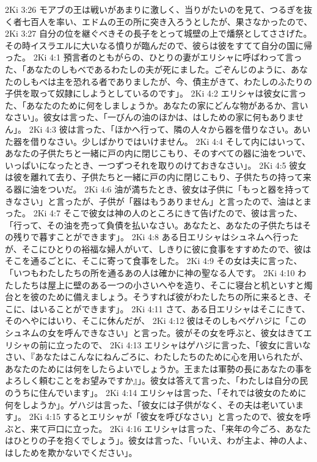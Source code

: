 2Ki 3:26  モアブの王は戦いがあまりに激しく、当りがたいのを見て、つるぎを抜く者七百人を率い、エドムの王の所に突き入ろうとしたが、果さなかったので、
2Ki 3:27  自分の位を継ぐべきその長子をとって城壁の上で燔祭としてささげた。その時イスラエルに大いなる憤りが臨んだので、彼らは彼をすてて自分の国に帰った。
2Ki 4:1  預言者のともがらの、ひとりの妻がエリシャに呼ばわって言った、「あなたのしもべであるわたしの夫が死にました。ごぞんじのように、あなたのしもべは主を恐れる者でありましたが、今、債主がきて、わたしのふたりの子供を取って奴隷にしようとしているのです」。
2Ki 4:2  エリシャは彼女に言った、「あなたのために何をしましょうか。あなたの家にどんな物があるか、言いなさい」。彼女は言った、「一びんの油のほかは、はしための家に何もありません」。
2Ki 4:3  彼は言った、「ほかへ行って、隣の人々から器を借りなさい。あいた器を借りなさい。少しばかりではいけません。
2Ki 4:4  そして内にはいって、あなたの子供たちと一緒に戸の内に閉じこもり、そのすべての器に油をついで、いっぱいになったとき、一つずつそれを取りのけておきなさい」。
2Ki 4:5  彼女は彼を離れて去り、子供たちと一緒に戸の内に閉じこもり、子供たちの持って来る器に油をついだ。
2Ki 4:6  油が満ちたとき、彼女は子供に「もっと器を持ってきなさい」と言ったが、子供が「器はもうありません」と言ったので、油はとまった。
2Ki 4:7  そこで彼女は神の人のところにきて告げたので、彼は言った、「行って、その油を売って負債を払いなさい。あなたと、あなたの子供たちはその残りで暮すことができます」。
2Ki 4:8  ある日エリシャはシュネムへ行ったが、そこにひとりの裕福な婦人がいて、しきりに彼に食事をすすめたので、彼はそこを通るごとに、そこに寄って食事をした。
2Ki 4:9  その女は夫に言った、「いつもわたしたちの所を通るあの人は確かに神の聖なる人です。
2Ki 4:10  わたしたちは屋上に壁のある一つの小さいへやを造り、そこに寝台と机といすと燭台とを彼のために備えましょう。そうすれば彼がわたしたちの所に来るとき、そこに、はいることができます」。
2Ki 4:11  さて、ある日エリシャはそこにきて、そのへやにはいり、そこに休んだが、
2Ki 4:12  彼はそのしもべゲハジに「このシュネムの女を呼んできなさい」と言った。彼がその女を呼ぶと、彼女はきてエリシャの前に立ったので、
2Ki 4:13  エリシャはゲハジに言った、「彼女に言いなさい、『あなたはこんなにねんごろに、わたしたちのために心を用いられたが、あなたのためには何をしたらよいでしょうか。王または軍勢の長にあなたの事をよろしく頼むことをお望みですか』」。彼女は答えて言った、「わたしは自分の民のうちに住んでいます」。
2Ki 4:14  エリシャは言った、「それでは彼女のために何をしようか」。ゲハジは言った、「彼女には子供がなく、その夫は老いています」。
2Ki 4:15  するとエリシャが「彼女を呼びなさい」と言ったので、彼女を呼ぶと、来て戸口に立った。
2Ki 4:16  エリシャは言った、「来年の今ごろ、あなたはひとりの子を抱くでしょう」。彼女は言った、「いいえ、わが主よ、神の人よ、はしためを欺かないでください」。
